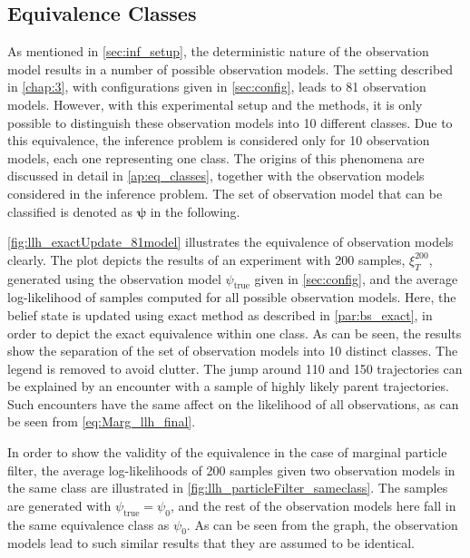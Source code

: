 \subsection{Equivalence Classes}
\label{sec:eq_classes}
As mentioned in \cref{sec:inf_setup}, the deterministic nature of the observation model results in a number of possible observation models. The setting described in \cref{chap:3}, with configurations given in \cref{sec:config}, leads to 81 observation models. However, with this experimental setup and the methods, it is only possible to distinguish these observation models into 10 different classes. Due to this equivalence, the inference problem is considered only for 10 observation models, each one representing one class. The origins of this phenomena are discussed in detail in \cref{ap:eq_classes}, together with the observation models considered in the inference problem. The set of observation model that can be classified is denoted as $ \boldsymbol{\psi} $ in the following. \par
\autoref{fig:llh_exactUpdate_81model} illustrates the equivalence of observation models clearly. The plot depicts the results of an experiment with 200 samples, $ \xi^{200}_T $, generated using the observation model $ \psi_{\text{true}} $ given in \cref{sec:config}, and the average log-likelihood of samples computed for all possible observation models. Here, the belief state is updated using exact method as described in \cref{par:bs_exact}, in order to depict the exact equivalence within one class. As can be seen, the results show the separation of the set of observation models into 10 distinct classes. The legend is removed to avoid clutter. The jump around 110 and 150 trajectories can be explained by an encounter with a sample of highly likely parent trajectories. Such encounters have the same affect on the likelihood of all observations, as can be seen from \autoref{eq:Marg_llh_final}.\par
In order to show the validity of the equivalence in the case of marginal particle filter, the average log-likelihoods of 200 samples given two observation models in the same class are illustrated in \autoref{fig:llh_particleFilter_sameclass}. The samples are generated with $ \psi_{\text{true}} = \psi_{0} $, and the rest of the observation models here fall in the same equivalence class as $ \psi_0 $. As can be seen from the graph, the observation models lead to such similar results that they are assumed to be identical. 
